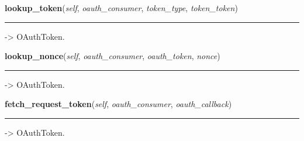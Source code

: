     \label{lib:oauth:OAuthDataStore:lookup_token}

    \vspace{0.5ex}

\hspace{.8\funcindent}\begin{boxedminipage}{\funcwidth}

    \raggedright \textbf{lookup\_token}(\textit{self}, \textit{oauth\_consumer}, \textit{token\_type}, \textit{token\_token})

    \vspace{-1.5ex}

    \rule{\textwidth}{0.5\fboxrule}
\setlength{\parskip}{2ex}
    -{\textgreater} OAuthToken.

\setlength{\parskip}{1ex}
    \end{boxedminipage}

    \label{lib:oauth:OAuthDataStore:lookup_nonce}

    \vspace{0.5ex}

\hspace{.8\funcindent}\begin{boxedminipage}{\funcwidth}

    \raggedright \textbf{lookup\_nonce}(\textit{self}, \textit{oauth\_consumer}, \textit{oauth\_token}, \textit{nonce})

    \vspace{-1.5ex}

    \rule{\textwidth}{0.5\fboxrule}
\setlength{\parskip}{2ex}
    -{\textgreater} OAuthToken.

\setlength{\parskip}{1ex}
    \end{boxedminipage}

    \label{lib:oauth:OAuthDataStore:fetch_request_token}

    \vspace{0.5ex}

\hspace{.8\funcindent}\begin{boxedminipage}{\funcwidth}

    \raggedright \textbf{fetch\_request\_token}(\textit{self}, \textit{oauth\_consumer}, \textit{oauth\_callback})

    \vspace{-1.5ex}

    \rule{\textwidth}{0.5\fboxrule}
\setlength{\parskip}{2ex}
    -{\textgreater} OAuthToken.

\setlength{\parskip}{1ex}
    \end{boxedminipage}

